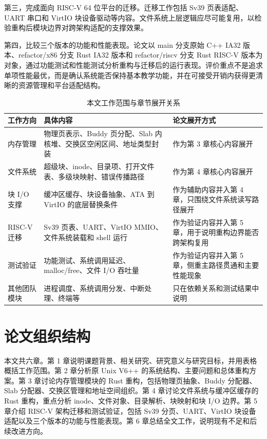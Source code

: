 第三，完成面向 RISC-V 64 位平台的迁移。迁移工作包括 Sv39 页表适配、UART 串口和 VirtIO 块设备驱动等内容。文件系统上层逻辑应尽可能复用，以检验重构后模块边界对跨架构适配的支撑效果。

第四，比较三个版本的功能和性能表现。论文以 main 分支原始 C++ IA32 版本、refactor/x86 分支 Rust IA32 版本和 refactor/riscv 分支 Rust RISC-V 版本为对象，通过功能测试和性能测试分析重构与迁移后的运行表现。评价重点不是追求单项性能最优，而是确认系统能否保持基本教学功能，并在可接受开销内获得更清晰的资源管理和平台适配结构。

\begin{table}[htbp]
  \centering
  \caption{本文工作范围与章节展开关系}\label{tab:work-scope}
  \begin{tabular}{p{}p{}p{}}
    \toprule
    \textbf{工作方向} & \textbf{具体内容} & \textbf{论文展开方式} \\
    \midrule
    内存管理 & 物理页表示、Buddy 页分配、Slab 内核堆、交换区空闲区间、地址类型封装 & 作为第 3 章核心内容展开 \\
    文件系统 & 超级块、inode、目录项、打开文件表、多级块映射、错误传播路径 & 作为第 4 章核心内容展开 \\
    块 I/O 支撑 & 缓冲区缓存、块设备抽象、ATA 到 VirtIO 的底层替换条件 & 作为辅助内容并入第 4 章，只围绕文件系统读写路径展开 \\
    RISC-V 迁移 & Sv39 页表、UART、VirtIO MMIO、文件系统装载和 shell 运行 & 作为验证内容并入第 5 章，用于说明重构边界能否跨架构复用 \\
    测试验证 & 功能测试、系统调用延迟、malloc/free、文件 I/O 吞吐量 & 作为验证内容并入第 5 章，侧重主路径贯通和主要性能现象 \\
    其他团队模块 & 进程调度、系统调用分发、中断处理、终端等 & 只在依赖关系和测试结果中说明 \\
    \bottomrule
  \end{tabular}
\end{table}

\section{论文组织结构}

本文共六章。第 1 章说明课题背景、相关研究、研究意义与研究目标，并用表格概括工作范围。第 2 章分析原 Unix V6++ 的系统结构、主要问题和总体重构方案。第 3 章讨论内存管理模块的 Rust 重构，包括物理页抽象、Buddy 分配器、Slab 分配器、交换区管理和地址空间组织。第 4 章讨论文件系统与缓冲区缓存的 Rust 重构，重点分析 inode、文件对象、目录解析、块映射和块 I/O 边界。第 5 章介绍 RISC-V 架构迁移和测试验证，包括 Sv39 分页、UART、VirtIO 块设备适配以及三个版本的功能与性能表现。第 6 章总结全文工作，说明现有不足和后续改进方向。
